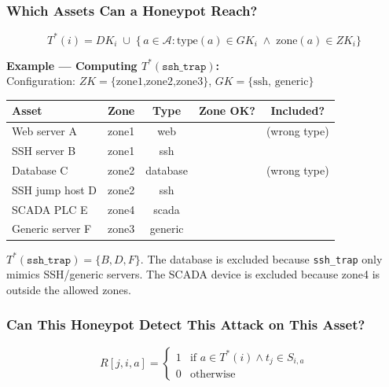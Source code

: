 \documentclass[journal]{IEEEtran}
\newcommand{\cmark}{\ding{51}}
\newcommand{\xmark}{\ding{55}}
\newcommand{\calA}{\mathcal{A}}
\begin{document}
\subsubsection{Which Assets Can a Honeypot Reach?}
\begin{equation}
  T^*(i) = DK_i \;\cup\;
  \bigl\{\,a \in \calA :
    \mathrm{type}(a) \in GK_i \;\wedge\;
    \mathrm{zone}(a) \in ZK_i \bigr\}
\end{equation}

\begin{examplebox}
\textbf{Example --- Computing $T^*(\texttt{ssh\_trap})$:}\\[3pt]
Configuration: $ZK=\{\text{zone1,zone2,zone3}\}$,
$GK=\{\text{ssh, generic}\}$
\begin{center}
\small
\renewcommand{\arraystretch}{1.1}
\begin{tabular}{@{}llccc@{}}
\toprule
\textbf{Asset} & \textbf{Zone} & \textbf{Type} &
\textbf{Zone OK?} & \textbf{Included?} \\
\midrule
Web server A    & zone1 & web    & \cmark & \xmark (wrong type) \\
SSH server B    & zone1 & ssh    & \cmark & \cmark \\
Database C      & zone2 & database& \cmark & \xmark (wrong type) \\
SSH jump host D & zone2 & ssh    & \cmark & \cmark \\
SCADA PLC E     & zone4 & scada  & \xmark & \xmark \\
Generic server F& zone3 & generic& \cmark & \cmark \\
\bottomrule
\end{tabular}
\end{center}
$T^*(\texttt{ssh\_trap}) = \{B, D, F\}$.
The database is excluded because \texttt{ssh\_trap} only
mimics SSH/generic servers.
The SCADA device is excluded because zone4 is outside
the allowed zones.
\end{examplebox}

\subsubsection{Can This Honeypot Detect This Attack
              on This Asset?}
\begin{equation}
  R[j,i,a] =
  \begin{cases}
    1 & \text{if } a \in T^*(i) \wedge t_j \in S_{i,a} \\
    0 & \text{otherwise}
  \end{cases}
\end{equation}
\end{document}

